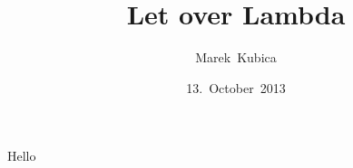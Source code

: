 

\title{Let over Lambda}
\author{Marek~Kubica}
\date{13.~October~2013}



\frame{\titlepage}

\begin{frame}
  Hello
\end{frame}


